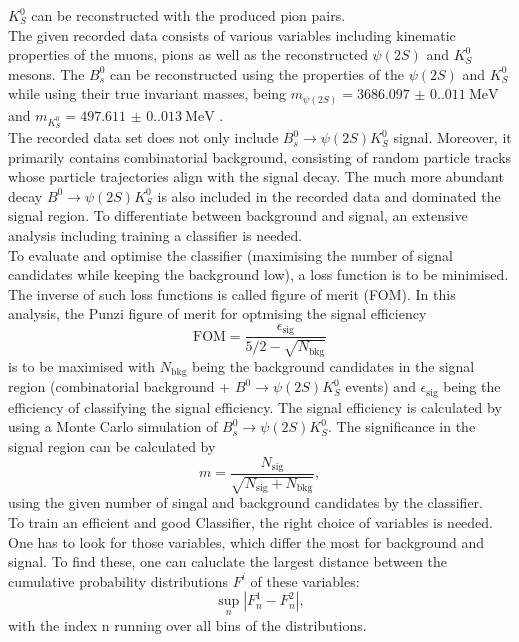 $K_S^0$ can be reconstructed with the produced pion pairs.\\
The given recorded data consists of various variables including kinematic properties of the muons, pions as well as the reconstructed $\psi (2S)$ and $K_S^0$ mesons. The $B_s^0$ can be reconstructed using the
properties of the $\psi (2S)$ and $K_S^0$ while using their true invariant masses, being $m_{\psi (2S)} = \qty{3686.097(0.011)}{\mega\electronvolt}$ and $m_{K_S^0} = \qty{497.611(0.013)}{\mega\electronvolt}$ \cite{PDG}.\\
The recorded data set does not only include $B_s^0 \to \psi (2S)K_S^0$ signal. Moreover, it primarily contains combinatorial background, consisting of random particle tracks whose particle trajectories align with the
signal decay. The much more abundant decay $B^0 \to \psi (2S)K_S^0$ is also included in the recorded data and dominated the signal region. To differentiate between background and signal, an extensive analysis including
training a classifier is needed.\\
To evaluate and optimise the classifier (maximising the number of signal candidates while keeping the background low), a loss function is to be minimised. The inverse of such loss functions is called figure of merit (FOM).
In this analysis, the Punzi figure of merit for optmising the signal efficiency
\begin{equation}
    \label{eq:FOM}
    \mathrm{FOM}  = \frac{\epsilon_{\mathrm{sig}}}{5/2 - \sqrt{N_{\mathrm{bkg}}}}
\end{equation}
is to be maximised with $N_{\mathrm{bkg}}$ being the background candidates in the signal region (combinatorial background + $B^0 \to \psi (2S)K_S^0$ events) and $\epsilon_{\mathrm{sig}}$ being the efficiency of classifying
the signal efficiency. The signal efficiency is calculated by using a Monte Carlo simulation of $B_s^0 \to \psi (2S)K_S^0$. The significance in the signal region can be calculated by
\begin{equation}
    \label{eq:sign}
    m = \frac{N_{\mathrm{sig}}}{\sqrt{N_{\mathrm{sig}} + N_{\mathrm{bkg}}}},
\end{equation}
using the given number of singal and background candidates by the classifier.\\
To train an efficient and good Classifier, the right choice of variables is needed. One has to look for those variables, which differ the most for background and signal. To find these, one can caluclate the 
largest distance between the cumulative probability distributions $F^i$ of these variables:
\begin{equation}
    \label{eq:Kolmogorov}
    \sup\limits_{n} | F_n^1 - F_n^2 |,
\end{equation}
with the index n running over all bins of the distributions. 